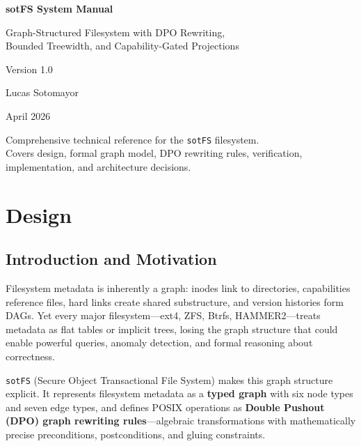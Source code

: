 \documentclass[11pt,a4paper,twoside]{report}
\theoremstyle{definition}
\newcommand{\sotFS}{\texttt{sotFS}}
\begin{document}
\begin{titlepage}
\centering\vspace*{3cm}
{\Huge\bfseries\color{tnblue} sotFS System Manual\par}
\vspace{0.8cm}
{\Large Graph-Structured Filesystem with DPO Rewriting,\\
Bounded Treewidth, and Capability-Gated Projections\par}
\vspace{1.5cm}
{\large Version 1.0\par}
\vspace{0.5cm}
{\large Lucas Sotomayor\par}
\vspace{0.5cm}
{\large April 2026\par}
\vfill
{\small Comprehensive technical reference for the \sotFS{} filesystem.\\
Covers design, formal graph model, DPO rewriting rules, verification,\\
implementation, and architecture decisions.\par}
\end{titlepage}

\tableofcontents
\newpage

\part{Design}

\chapter{Introduction and Motivation}

Filesystem metadata is inherently a graph: inodes link to directories,
capabilities reference files, hard links create shared substructure, and
version histories form DAGs.  Yet every major filesystem---ext4, ZFS, Btrfs,
HAMMER2---treats metadata as flat tables or implicit trees, losing the graph
structure that could enable powerful queries, anomaly detection, and formal
reasoning about correctness.

\sotFS{} (Secure Object Transactional File System) makes this graph structure
explicit.  It represents filesystem metadata as a \textbf{typed graph} with six
node types and seven edge types, and defines POSIX operations as \textbf{Double
Pushout (DPO) graph rewriting rules}---algebraic transformations with
mathematically precise preconditions, postconditions, and gluing constraints.
\end{document}
